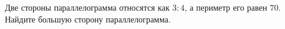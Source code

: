 \begin{ex}
	\begin{condition}
		Две стороны параллелограмма относятся как \(3:4\), а периметр его равен \( 70 \). Найдите большую сторону параллелограмма.
	\end{condition}
\end{ex}